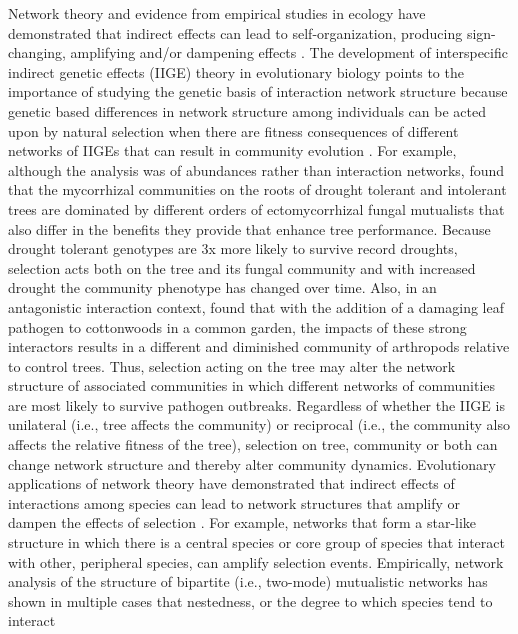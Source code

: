 \documentclass[11pt,twocolumn,twoside,lineno]{pnas-new}
\begin{document}
Network theory and evidence from empirical studies in ecology have
demonstrated that indirect effects can lead to self-organization,
producing sign-changing, amplifying and/or dampening effects
\cite{Newman2006, Sole2006}. The development of interspecific indirect
genetic effects (IIGE) theory \cite{Shuster2006COMMUNITYSTRUCTURE} in
evolutionary biology points to the importance of studying the genetic
basis of interaction network structure because genetic based
differences in network structure among individuals can be acted upon
by natural selection when there are fitness consequences of different
networks of IIGEs that can result in community evolution
\cite{Whitham2020IntraspecificEvolution}. For example, although the
analysis was of abundances rather than interaction networks,
\citep{Gehring2014PlantChange, Gehring2017a} found that the
mycorrhizal communities on the roots of drought tolerant and
intolerant trees are dominated by different orders of ectomycorrhizal
fungal mutualists that also differ in the benefits they provide that
enhance tree performance. Because drought tolerant genotypes are 3x
more likely to survive record droughts, selection acts both on the
tree and its fungal community and with increased drought the community
phenotype has changed over time. Also, in an antagonistic interaction
context, \citep{Busby2015} found that with the addition of a damaging
leaf pathogen to cottonwoods in a common garden, the impacts of these
strong interactors results in a different and diminished community of
arthropods relative to control trees. Thus, selection acting on the
tree may alter the network structure of associated communities in
which different networks of communities are most likely to survive
pathogen outbreaks. Regardless of whether the IIGE is unilateral
(i.e., tree affects the community) or reciprocal (i.e., the community
also affects the relative fitness of the tree), selection on tree,
community or both can change network structure
\cite{Whitham2020IntraspecificEvolution} and thereby alter community
dynamics.  Evolutionary applications of network theory have
demonstrated that indirect effects of interactions among species can
lead to network structures that amplify or dampen the effects of
selection \cite{Lieberman2005}. For example, networks that form a
star-like structure in which there is a central species or core group
of species that interact with other, peripheral species, can amplify
selection events. Empirically, network analysis of the structure of
bipartite (i.e., two-mode) mutualistic networks has shown in multiple
cases that nestedness, or the degree to which species tend to interact
\end{document}
